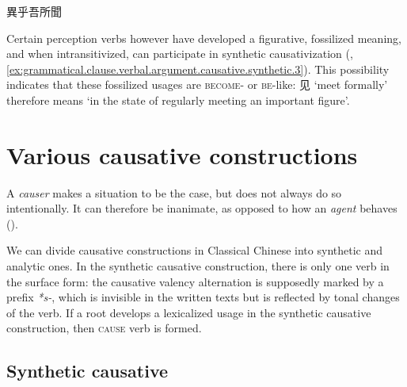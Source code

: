 \documentclass[UTF8, a4paper, oneside, scheme=plain, 12pt]{ctexrep}
\newcommand*{\term}[1]{\emph{#1}}
\newcommand{\form}[1]{\emph{#1}}
\newcommand{\translate}[1]{`#1'}
\newcommand*{\category}[1]{\textsc{#1}}
\begin{document}
\begin{exe}
    \ex\label{ex:grammatical.clause.verbal.argument.simple.experience.do.1} 異乎吾所聞
\end{exe}

Certain perception verbs however have developed a figurative, fossilized meaning,
and when intransitivized, can participate in synthetic causativization
(,
\ref{ex:grammatical.clause.verbal.argument.causative.synthetic.3}).
This possibility indicates that these fossilized usages are \category{become}- or \category{be}-like:
见 \translate{meet formally} therefore means \translate{in the state of regularly meeting an important figure}.

\section{Various causative constructions}\label{sec:grammatical.clause.verbal.argument-structure.causative}

A \term{causer} makes a situation to be the case,
but does not always do so intentionally.
It can therefore be inanimate,
as opposed to how an \term{agent} behaves
().

We can divide causative constructions in Classical Chinese into
synthetic and analytic ones.
In the synthetic causative construction,
there is only one verb in the surface form:
the causative valency alternation is supposedly marked by a prefix \form{*s-},
which is invisible in the written texts but is reflected by tonal changes of the verb.
If a root develops a lexicalized usage in the synthetic causative construction,
then \category{cause} verb is formed.

\subsection{Synthetic causative}\label{sec:grammatical.clause.verbal.argument-structure.causative.synthetic}
\end{document}
